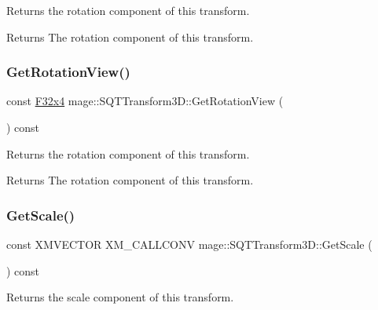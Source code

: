 Returns the rotation component of this transform.

\begin{DoxyReturn}{Returns}
The rotation component of this transform. 
\end{DoxyReturn}
\mbox{\label{classmage_1_1_s_q_t_transform3_d_ae7d2f97b41f53c23919e208bfd92f2d9}} 
\subsubsection{\texorpdfstring{Get\+Rotation\+View()}{GetRotationView()}}
{\footnotesize\ttfamily const \mbox{\hyperlink{namespacemage_a851648f37dfb126a2d2f973e102861ad}{F32x4}} mage\+::\+S\+Q\+T\+Transform3\+D\+::\+Get\+Rotation\+View (\begin{DoxyParamCaption}{ }\end{DoxyParamCaption}) const\hspace{0.3cm}{\ttfamily [noexcept]}}

Returns the rotation component of this transform.

\begin{DoxyReturn}{Returns}
The rotation component of this transform. 
\end{DoxyReturn}
\mbox{\label{classmage_1_1_s_q_t_transform3_d_a696f2629bbf7ae9f53149b060b8667f7}} 
\subsubsection{\texorpdfstring{Get\+Scale()}{GetScale()}}
{\footnotesize\ttfamily const X\+M\+V\+E\+C\+T\+OR X\+M\+\_\+\+C\+A\+L\+L\+C\+O\+NV mage\+::\+S\+Q\+T\+Transform3\+D\+::\+Get\+Scale (\begin{DoxyParamCaption}{ }\end{DoxyParamCaption}) const\hspace{0.3cm}{\ttfamily [noexcept]}}

Returns the scale component of this transform.

